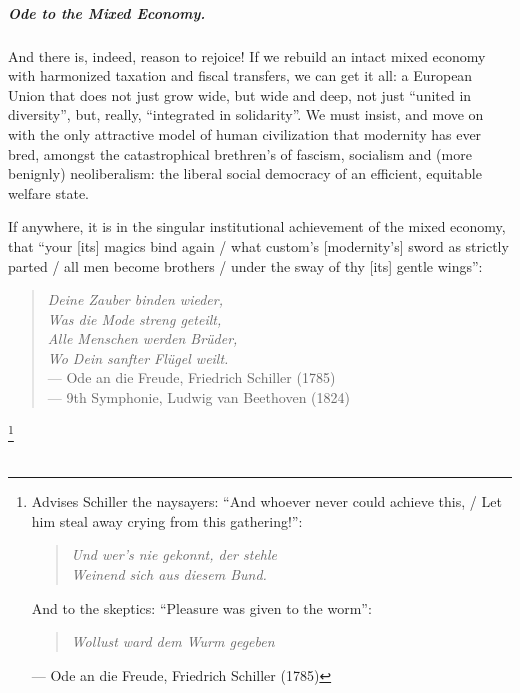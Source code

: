 \documentclass[11pt,a4paper,oneside]{article}
\begin{document}
\paragraph{Ode to the Mixed Economy.} And there is, indeed, reason to rejoice! If we rebuild an intact mixed economy with harmonized taxation and fiscal transfers, we can get it all:
a European Union that does not just grow wide, but wide and deep, not just ``united in diversity'', but, really, ``integrated in solidarity''.
We must insist, and move on with the only attractive model of human civilization that modernity has ever bred, amongst the catastrophical brethren's of fascism, socialism and (more benignly) neoliberalism:
the liberal social democracy of an efficient, equitable welfare state.

If anywhere, it is in the singular institutional achievement of the mixed economy, that ``your [its] magics bind again / what custom's [modernity's] sword as strictly parted / all men become brothers / under the sway of thy [its] gentle wings'':
\begin{verse}
	\emph{Deine Zauber binden wieder,}\\
	\emph{Was die Mode streng geteilt,}\\
	\emph{Alle Menschen werden Br\"{u}der,}\\
	\emph{Wo Dein sanfter Fl\"{u}gel weilt.}\\
	--- Ode an die Freude, Friedrich Schiller (1785)\\
	--- 9th Symphonie, Ludwig van Beethoven (1824)
\end{verse}

\footnote{
	Advises Schiller the naysayers:
	``And whoever never could achieve this, / Let him steal away crying from this gathering!'':
	\begin{verse}
		\emph{Und wer's nie gekonnt, der stehle}\\
		\emph{Weinend sich aus diesem Bund.}\\
	\end{verse}
	And to the skeptics:
	``Pleasure was given to the worm'':
	\begin{verse}
		\emph{Wollust ward dem Wurm gegeben}
	\end{verse}
	--- Ode an die Freude, Friedrich Schiller (1785)
}

\pagebreak

\appendix
\chapter{\appendixname}

\glsaddall
\renewcommand*{\glspostdescription}{}
\printglossaries

\pagebreak

\end{document}
